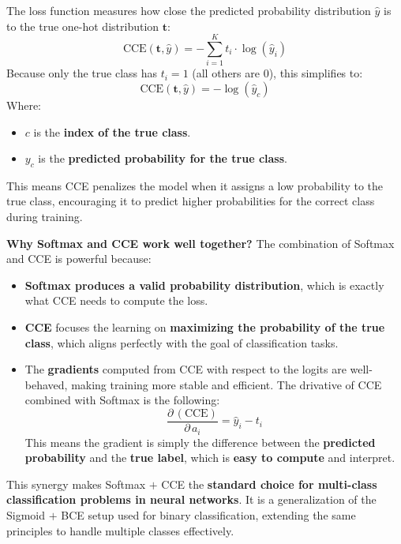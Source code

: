 \highspace
The  loss function measures how close the predicted probability distribution $\hat{y}$ is to the true one-hot distribution $\mathbf{t}$:
\begin{equation}
    \text{CCE}(\mathbf{t}, \hat{y}) = - \sum_{i=1}^{K} t_{i} \cdot \log(\hat{y}_{i})
\end{equation}
Because only the true class has $t_{i} = 1$ (all others are 0), this simplifies to:
\begin{equation}
    \text{CCE}(\mathbf{t}, \hat{y}) = - \log(\hat{y}_{c})
\end{equation}
Where:
\begin{itemize}
    \item $c$ is the \textbf{index of the true class}.
    \item $y_{c}$ is the \textbf{predicted probability for the true class}.
\end{itemize}
This means CCE penalizes the model when it assigns a low probability to the true class, encouraging it to predict higher probabilities for the correct class during training.

\highspace
\textcolor{Green3}{ \textbf{Why Softmax and CCE work well together?}} The combination of Softmax and CCE is powerful because:
\begin{itemize}
    \item[\textcolor{Green3}{\faIcon{check}}] \textbf{Softmax produces a valid probability distribution}, which is exactly what CCE needs to compute the loss.
    \item[\textcolor{Green3}{\faIcon{check}}] \textbf{CCE} focuses the learning on \textbf{maximizing the probability of the true class}, which aligns perfectly with the goal of classification tasks.
    \item[\textcolor{Green3}{\faIcon{check}}] The \textbf{gradients} computed from CCE with respect to the logits are well-behaved, making training more stable and efficient. The drivative of CCE combined with Softmax is the following:
    \begin{equation}
        \dfrac{\partial \, \left(\text{CCE}\right)}{\partial \, a_{i}} = \hat{y}_{i} - t_{i}
    \end{equation}
    This means the gradient is simply the difference between the \textbf{predicted probability} and the \textbf{true label}, which is \textbf{easy to compute} and interpret.
\end{itemize}
This synergy makes Softmax $+$ CCE the \textbf{standard choice for multi-class classification problems in neural networks}. It is a generalization of the Sigmoid $+$ BCE setup used for binary classification, extending the same principles to handle multiple classes effectively.